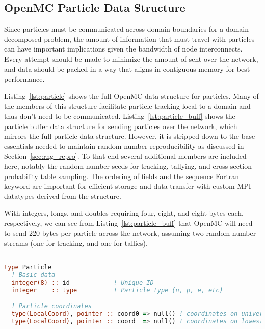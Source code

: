 \begin{appendices}
\chapter{OpenMC Particle Data Structure}
\label{app:particle_struct}

Since particles must be communicated across domain boundaries for a
domain-decomposed problem, the amount of information that must travel with
particles can have important implications given the bandwidth of node
interconnects. Every attempt should be made to minimize the amount
of sent over the network, and data should be packed in a way that aligns in
contiguous memory for best performance.

Listing~\ref{lst:particle} shows the full OpenMC data structure for particles.
Many of the members of this structure facilitate particle tracking local to a
domain and thus don't need to be communicated.  Listing~\ref{lst:particle_buff}
shows the particle buffer data structure for sending particles over the network,
which mirrors the full particle data structure.  However, it is stripped down to
the base essentials needed to maintain random number reproducibility as
discussed in Section~\ref{sec:rng_repro}. To that end several additional members
are included here, notably the random number seeds for tracking, tallying, and
cross section probability table sampling. The ordering of fields and the
sequence Fortran keyword are important for efficient storage and data transfer
with custom MPI datatypes derived from the structure.

With integers, longs, and doubles requiring four, eight, and
eight bytes each, respectively, we can see from Listing~\ref{lst:particle_buff}
that OpenMC will need to send 220 bytes per particle across the network,
assuming two random number streams (one for tracking, and one for tallies).

\singlespacing
\begin{lstlisting}[language=Fortran, frame=none, keepspaces=true, frame=single, linewidth=6in, xleftmargin=0.0in,
caption={Full OpenMC particle data structure. \label{lst:particle}}]

type Particle
  ! Basic data
  integer(8) :: id            ! Unique ID
  integer    :: type          ! Particle type (n, p, e, etc)

  ! Particle coordinates
  type(LocalCoord), pointer :: coord0 => null() ! coordinates on universe 0
  type(LocalCoord), pointer :: coord  => null() ! coordinates on lowest univ


\end{lstlisting}
\end{appendices}
